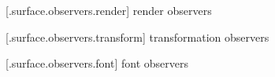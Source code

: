  [\iotwod.surface.observers.render] { render observers}

%	

 [\iotwod.surface.observers.transform] { transformation observers}

%	

 [\iotwod.surface.observers.font] { font observers}

%	

